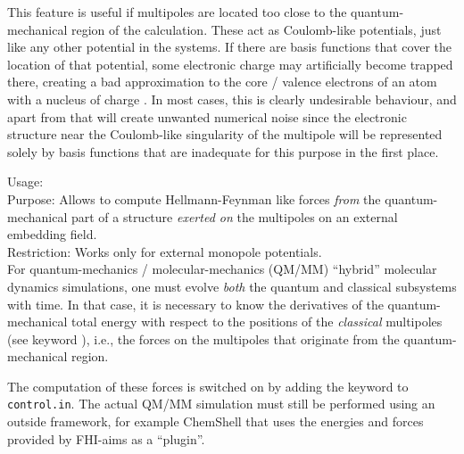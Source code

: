 This feature is useful if multipoles are located too close
to the quantum-mechanical region of the calculation. These act as
Coulomb-like potentials, just like any other potential in the
systems. If there are basis functions that cover the location of that 
potential, some electronic charge may artificially become trapped
there, creating a bad approximation to the core / valence
electrons of an atom with a nucleus of charge . In most
cases, this is clearly undesirable behaviour, and apart from that will
create unwanted numerical noise since the electronic structure near
the Coulomb-like singularity of the multipole will be represented
solely by basis functions that are inadequate for this purpose in the
first place. 

{
  \noindent
  Usage:  \\[1.0ex]
  Purpose: Allows to compute Hellmann-Feynman like forces \emph{from}
    the quantum-mechanical part of a structure \emph{exerted on} the
    multipoles on an external embedding field. \\[1.0ex]
  Restriction: Works only for external monopole potentials. \\[1.0ex]
}
For quantum-mechanics / molecular-mechanics (QM/MM) ``hybrid''
molecular dynamics simulations, one must evolve \emph{both} the
quantum and classical subsystems with time. In that case, it is
necessary to know the derivatives of the quantum-mechanical total
energy with respect to the positions of the \emph{classical}
multipoles (see keyword ), i.e., the forces on the
multipoles that originate from the quantum-mechanical region. 

The
computation of these forces is switched on by adding the
 keyword to \texttt{control.in}. The actual QM/MM
simulation must still be performed using an outside framework, for
example ChemShell \cite{Sherwood03} that uses the energies and forces
provided by FHI-aims as a ``plugin''. 

